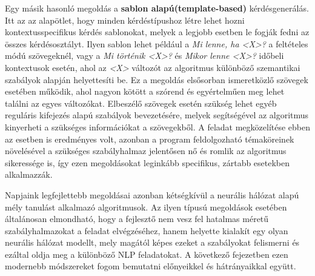 Egy másik hasonló megoldás a \textbf{sablon alapú(template-based)} kérdésgenerálás. Itt az az alapötlet, hogy minden kérdéstípushoz létre lehet hozni kontextusspecifikus kérdés sablonokat, melyek a legjobb esetben le fogják fedni az összes kérdésosztályt. Ilyen sablon lehet például a \textit{Mi lenne, ha <X>?} a feltételes módú szövegeknél, vagy a \textit{Mi történik <X>?} és \textit{Mikor lenne <X>?} időbeli kontextusok esetén, ahol az \textit{<X>} változót az algoritmus különböző szemantikai szabályok alapján helyettesíti be. Ez a megoldás elsősorban ismeretközlő szövegek esetében működik, ahol nagyon kötött a szórend és egyértelműen meg lehet találni az egyes változókat. Elbeszélő szövegek esetén szükség lehet egyéb reguláris kifejezés alapú szabályok bevezetésére, melyek segítségével az algoritmus kinyerheti a szükséges információkat a szövegekből. A feladat megközelítése ebben az esetben is eredményes volt, azonban a program feldolgozható témaköreinek növelésével a szükséges szabályhalmaz jelentősen nő és romlik az algoritmus sikeressége is, így ezen megoldásokat leginkább specifikus, zártabb esetekben alkalmazzák.

Napjaink legfejlettebb megoldásai azonban kétségkívül a neurális hálózat alapú mély tanulást alkalmazó algoritmusok. Az ilyen típusú megoldások esetében általánosan elmondható, hogy a fejlesztő nem vesz fel hatalmas méretű szabályhalmazokat a feladat elvégzéséhez, hanem helyette kialakít egy olyan neurális hálózat modellt, mely magától képes ezeket a szabályokat felismerni és ezáltal oldja meg a különböző NLP feladatokat. A következő fejezetben ezen modernebb módszereket fogom bemutatni előnyeikkel és hátrányaikkal együtt.


